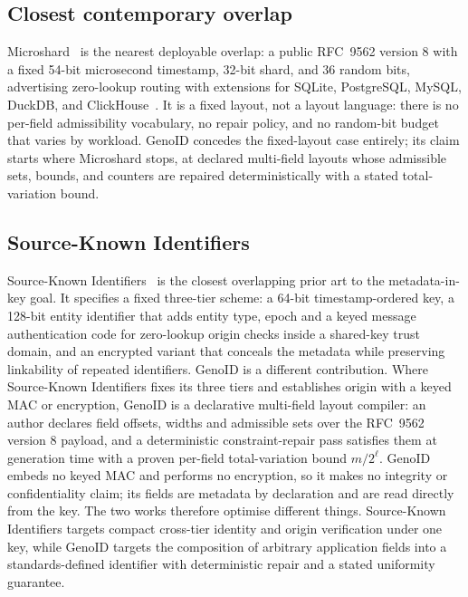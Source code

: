 \documentclass{svproc}
\begin{document}
\subsection{Closest contemporary overlap}
Microshard~\cite{14} is the nearest deployable overlap: a public RFC~9562 version 8 with a fixed 54-bit microsecond timestamp, 32-bit shard, and 36 random bits, advertising zero-lookup routing with extensions for SQLite, PostgreSQL, MySQL, DuckDB, and ClickHouse~\cite{14}. It is a fixed layout, not a layout language: there is no per-field admissibility vocabulary, no repair policy, and no random-bit budget that varies by workload. GenoID concedes the fixed-layout case entirely; its claim starts where Microshard stops, at declared multi-field layouts whose admissible sets, bounds, and counters are repaired deterministically with a stated total-variation bound.
\subsection{Source-Known Identifiers}
Source-Known Identifiers~\cite{26} is the closest overlapping prior art to the metadata-in-key goal. It specifies a fixed three-tier scheme: a 64-bit timestamp-ordered key, a 128-bit entity identifier that adds entity type, epoch and a keyed message authentication code for zero-lookup origin checks inside a shared-key trust domain, and an encrypted variant that conceals the metadata while preserving linkability of repeated identifiers. GenoID is a different contribution. Where Source-Known Identifiers fixes its three tiers and establishes origin with a keyed MAC or encryption, GenoID is a declarative multi-field layout compiler: an author declares field offsets, widths and admissible sets over the RFC~9562 version 8 payload, and a deterministic constraint-repair pass satisfies them at generation time with a proven per-field total-variation bound $m/2^\ell$. GenoID embeds no keyed MAC and performs no encryption, so it makes no integrity or confidentiality claim; its fields are metadata by declaration and are read directly from the key. The two works therefore optimise different things. Source-Known Identifiers targets compact cross-tier identity and origin verification under one key, while GenoID targets the composition of arbitrary application fields into a standards-defined identifier with deterministic repair and a stated uniformity guarantee.
\end{document}
